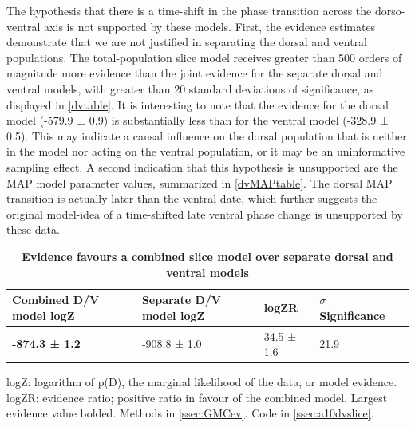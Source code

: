 \documentclass{ut-thesis}
\begin{document}
\begin{NoHyper}
The hypothesis that there is a time-shift in the phase transition across the dorso-ventral axis is not supported by these models. First, the evidence estimates demonstrate that we are not justified in separating the dorsal and ventral populations. The total-population slice model receives greater than 500 orders of magnitude more evidence than the joint evidence for the separate dorsal and ventral models, with greater than 20 standard deviations of significance, as displayed in \autoref{dvtable}. It is interesting to note that the evidence for the dorsal model (-579.9 ± 0.9) is substantially less than for the ventral model (-328.9 ± 0.5). This may indicate a causal influence on the dorsal population that is neither in the model nor acting on the ventral population, or it may be an uninformative sampling effect. A second indication that this hypothesis is unsupported are the MAP model parameter values, summarized in \autoref{dvMAPtable}. The dorsal MAP transition is actually later than the ventral date, which further suggests the original model-idea of a time-shifted late ventral phase change is unsupported by these data.

\begin{table}[!ht]
    \centering
    \caption{{\bf Evidence favours a combined slice model over separate dorsal and ventral models}}
    \begin{tabular}{|l|l|l|l|l|}
        \hline
        {\bf Combined D/V model logZ} & {\bf Separate D/V model logZ} & {\bf logZR} & {\bf $\sigma$ Significance}\\ \hline
        \textbf{-874.3 ± 1.2} & -908.8 ± 1.0 & 34.5 ± 1.6 & 21.9\\ \hline
    \end{tabular}
    \begin{flushleft} logZ: logarithm of p(D), the marginal likelihood of the data, or model evidence. logZR: evidence ratio; positive ratio in favour of the combined model. Largest evidence value bolded.
    Methods in \autoref{ssec:GMCev}.
    Code in \autoref{ssec:a10dvslice}.     
    \end{flushleft}
    \label{dvtable}
\end{table}


\end{NoHyper}
\end{document}
